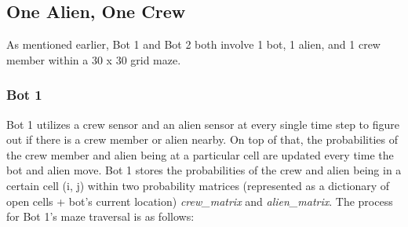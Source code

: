 \documentclass[11pt]{article}
\begin{document}
\subsection{One Alien, One Crew}

As mentioned earlier, Bot 1 and Bot 2 both involve 1 bot, 1 alien, and 1 crew member within a 30 x 30 grid maze.

\subsubsection{Bot 1}

Bot 1 utilizes a crew sensor and an alien sensor at every single time step to figure out if there is a crew member or alien nearby. On top of that, the probabilities of the crew member and alien being at a particular cell are updated every time the bot and alien move. Bot 1 stores the probabilities of the crew and alien being in a certain cell (i, j) within two probability matrices (represented as a dictionary of open cells + bot's current location) \textit{crew\_matrix} and \textit{alien\_matrix}. The process for Bot 1's maze traversal is as follows:
\end{document}
